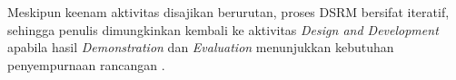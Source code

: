 Meskipun keenam aktivitas disajikan berurutan, proses DSRM bersifat iteratif, sehingga penulis dimungkinkan kembali ke aktivitas \textit{Design and Development} apabila hasil \textit{Demonstration} dan \textit{Evaluation} menunjukkan kebutuhan penyempurnaan rancangan \parencite{peffers_design_2007}.